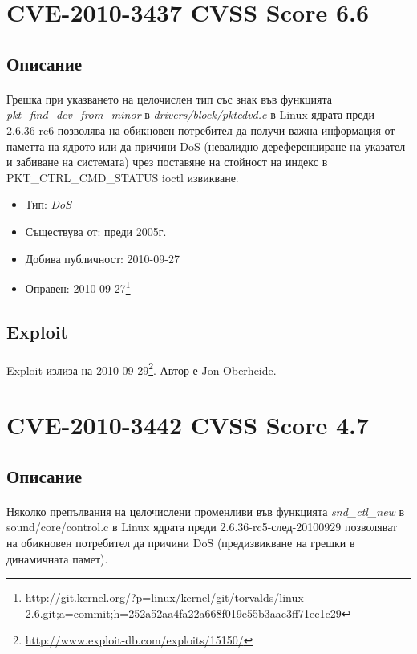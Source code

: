 \documentclass[a4paper,12pt,leqno]{article}
\begin{document}
\section{CVE-2010-3437 CVSS Score 6.6}
\subsection{Описание}
\paragraph{}
Грешка при указването на целочислен тип със знак във функцията \\ \textit{pkt\_find\_dev\_from\_minor} в \textit{drivers/block/pktcdvd.c} в Linux ядрата преди 2.6.36-rc6 позволява на обикновен потребител да получи важна информация от паметта на ядрото или да причини DoS (невалидно дереференциране на указател и забиване на системата) чрез поставяне на стойност на индекс в \\ PKT\_CTRL\_CMD\_STATUS ioctl извикване.

\begin{itemize}
    \item Тип: \textit{DoS}
    \item Съществува от: преди 2005г.
  	\item Добива публичност: 2010-09-27
    \item Оправен: 2010-09-27\footnote{\url{http://git.kernel.org/?p=linux/kernel/git/torvalds/linux-2.6.git;a=commit;h=252a52aa4fa22a668f019e55b3aac3ff71ec1c29}}
\end{itemize}

\subsection{Exploit}
\paragraph{}
Exploit излиза на 2010-09-29\footnote{\url{http://www.exploit-db.com/exploits/15150/}}. Автор е Jon Oberheide.


\section{CVE-2010-3442 CVSS Score 4.7}
\subsection{Описание}
\paragraph{}
Няколко препълвания на целочислени променливи във функцията \textit{snd\_ctl\_new} в sound/core/control.c в Linux ядрата преди 2.6.36-rc5-след-20100929 позволяват на обикновен потребител да причини DoS (предизвикване на грешки в динамичната памет).
\end{document}
